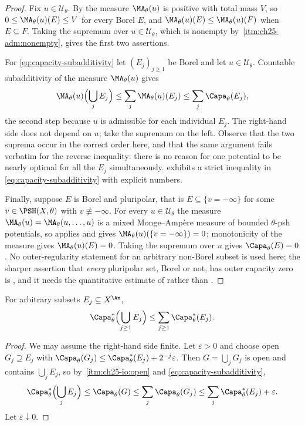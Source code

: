 \begin{proof}
Fix $u\in\mathcal U_\theta$.  By  the
measure $\MA_\theta(u)$ is positive with total mass $V$, so
$0\leq\MA_\theta(u)(E)\leq V$ for every Borel $E$, and
$\MA_\theta(u)(E)\leq\MA_\theta(u)(F)$ when $E\subseteq F$.  Taking the
supremum over $u\in\mathcal U_\theta$, which is nonempty by
\,\cref{itm:ch25-adm:nonempty}, gives the
first two assertions.

For \eqref{eq:capacity-subadditivity} let $(E_j)_{j\geq1}$ be Borel and let
$u\in\mathcal U_\theta$.  Countable subadditivity of the measure
$\MA_\theta(u)$ gives
\[
 \MA_\theta(u)\Bigl(\bigcup_jE_j\Bigr)
 \leq\sum_j\MA_\theta(u)(E_j)
 \leq\sum_j\Capa_\theta(E_j),
\]
the second step because $u$ is admissible for each individual $E_j$.  The
right-hand side does not depend on $u$; take the supremum on the left.
Observe that the two suprema occur in the correct order here, and that the
same argument fails verbatim for the reverse inequality: there is no reason
for one potential to be nearly optimal for all the $E_j$ simultaneously.
 exhibits a strict inequality in
\eqref{eq:capacity-subadditivity} with explicit numbers.

Finally, suppose $E$ is Borel and pluripolar, that is
$E\subseteq\{v=-\infty\}$ for some $v\in\PSH(X,\theta)$ with
$v\not\equiv-\infty$.  For every $u\in\mathcal U_\theta$ the measure
$\MA_\theta(u)=\MA_\theta(u,\ldots,u)$ is a mixed Monge--Amp\`ere measure
of bounded $\theta$-psh potentials, so
 applies and gives
$\MA_\theta(u)(\{v=-\infty\})=0$; monotonicity of the measure gives
$\MA_\theta(u)(E)=0$.  Taking the supremum over $u$ gives
$\Capa_\theta(E)=0$.  No outer-regularity statement for an arbitrary
non-Borel subset is used here; the sharper assertion that \emph{every}
pluripolar set, Borel or not, has outer capacity zero is
, and it needs the quantitative estimate of
 rather than
.
\end{proof}

\begin{corollary}
\label{cor:ch25-outer-subadditivity}
For arbitrary subsets $E_j\subseteq X^{\An}$,
\[
 \Capa_\theta^*\Bigl(\bigcup_{j\geq1}E_j\Bigr)
 \leq\sum_{j\geq1}\Capa_\theta^*(E_j).
\]
\end{corollary}

\begin{proof}
We may assume the right-hand side finite.  Let $\varepsilon>0$ and choose
open $G_j\supseteq E_j$ with
$\Capa_\theta(G_j)\leq\Capa_\theta^*(E_j)+2^{-j}\varepsilon$.  Then
$G=\bigcup_jG_j$ is open and contains $\bigcup_jE_j$, so by
\,\cref{itm:ch25-io:open} and
\eqref{eq:capacity-subadditivity},
\[
 \Capa^*_\theta\Bigl(\bigcup_jE_j\Bigr)\leq\Capa_\theta(G)
 \leq\sum_j\Capa_\theta(G_j)
 \leq\sum_j\Capa^*_\theta(E_j)+\varepsilon .
\]
Let $\varepsilon\downarrow0$.
\end{proof}

